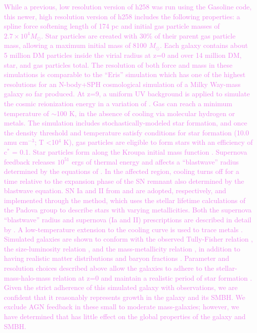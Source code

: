 \documentclass[manuscript]{aastex}
\begin{document}
\textcolor{violet}{
While a previous, low resolution version of h258 was run using the Gasoline code, this newer, high resolution version of h258 includes the following properties: a spline force softening length of 174 pc and initial gas particle masses of $2.7 \times 10^4 M_{\odot}$. Star particles are created with 30\% of their parent gas particle mass, allowing a maximum initial mass of 8100 $M_{\odot}$. Each galaxy contains about 5 million DM particles inside the virial radius at z=0 and over 14 million DM, star, and gas particles total. The resolution of both force and mass in these simulations is comparable to the ``Eris'' simulation which has one of the highest resolutions for an N-body+SPH cosmological simulation of a Milky Way-mass galaxy so far produced.  At z=9, a uniform UV background is applied to simulate the cosmic reionization energy in a variation of \cite{Haardt2012}.
}
\textcolor{violet}{
Gas can reach a minimum temperature of $\sim$100 K, in the absence of cooling via molecular hydrogen or metals. The simulation includes stochastically-modeled star formation, and once the density threshold and temperature satisfy conditions for star formation (10.0 amu cm$^{-3}$; T \textless 10$^4$ K), gas particles are eligible to form stars with an efficiency of c$^*$ = 0.1. Star particles form along the Kroupa initial mass function \citep{Kroupa2001}. Supernova feedback releases $10^{51}$ ergs of thermal energy and affects a ``blastwave'' radius determined by the equations of \cite{Ostriker1988}. In the affected region, cooling turns off for a time relative to the expansion phase of the SN remnant also determined by the blastwave equation. SN Ia and II from \cite{Thielemann1986} and \cite{Woosley1986} are adopted, respectively, and implemented through the \cite{Raiteri1996} method, which uses the stellar lifetime calculations of the Padova group \citep{Alongi1993, Bressan1993, Bertelli1994} to describe stars with varying metallicities. Both the supernova ``blastwave'' radius and supernova (Ia and II) prescriptions are described in detail by \cite{Stinson2006}. A low-temperature extension to the cooling curve is used to trace metals \citep{Bromm2001}. Simulated galaxies are shown to conform with the observed Tully-Fisher relation \citep{Governato2009}, the size-luminosity relation \citep{Brooks2011}, and the mass-metallicity relation \citep{Brooks2007}, in addition to having realistic matter distributions and baryon fractions \citep{Governato2009a,Guedes2011}. Parameter and resolution choices described above allow the galaxies to adhere to the stellar-mass-halo-mass relation at z=0 and maintain a realistic period of star formation \citep{Moster2010,Munshi2013,Brooks2007,Maiolino2008}. Given the strict adherence of this simulated galaxy with observations, we are confident that it reasonably represents growth in the galaxy and its SMBH. We exclude AGN feedback in these small to moderate mass-galaxies; however, we have determined that has little effect on the global properties of the galaxy and SMBH.
}
 
\end{document}
